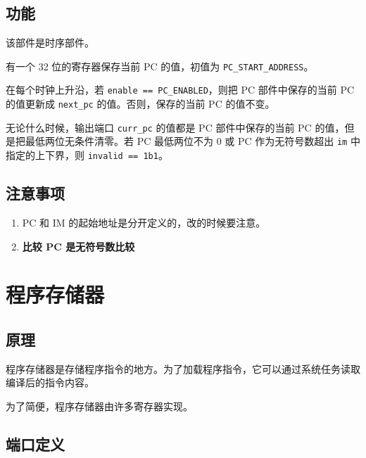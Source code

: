 \documentclass[12pt,AutoFakeBold,AutoFakeSlant]{article}
\providecommand{\tightlist}{%
  \setlength{\itemsep}{0pt}\setlength{\parskip}{0pt}}
\begin{document}
\hypertarget{ux529fux80fd-1}{%
\subsection{功能}\label{ux529fux80fd-1}}

该部件是时序部件。

有一个 32 位的寄存器保存当前 PC 的值，初值为
\texttt{PC\_START\_ADDRESS}。

在每个时钟上升沿，若 \texttt{enable\ ==\ PC\_ENABLED}，则把 PC
部件中保存的当前 PC 的值更新成 \texttt{next\_pc} 的值。否则，保存的当前
PC 的值不变。

无论什么时候，输出端口 \texttt{curr\_pc} 的值都是 PC 部件中保存的当前 PC
的值，但是把最低两位无条件清零。若 PC 最低两位不为 0 或 PC
作为无符号数超出 \texttt{im} 中指定的上下界，则
\texttt{invalid\ ==\ 1\textquotesingle{}b1}。

\hypertarget{ux6ce8ux610fux4e8bux9879-1}{%
\subsection{注意事项}\label{ux6ce8ux610fux4e8bux9879-1}}

\begin{enumerate}
\def\labelenumi{\arabic{enumi}.}
\tightlist
\item
  PC 和 IM 的起始地址是分开定义的，改的时候要注意。
\item
  \textbf{比较 PC 是无符号数比较}
\end{enumerate}

\hypertarget{ux7a0bux5e8fux5b58ux50a8ux5668}{%
\section{程序存储器}\label{ux7a0bux5e8fux5b58ux50a8ux5668}}

\hypertarget{ux539fux7406-2}{%
\subsection{原理}\label{ux539fux7406-2}}

程序存储器是存储程序指令的地方。为了加载程序指令，它可以通过系统任务读取编译后的指令内容。

为了简便，程序存储器由许多寄存器实现。

\hypertarget{ux7aefux53e3ux5b9aux4e49-1}{%
\subsection{端口定义}\label{ux7aefux53e3ux5b9aux4e49-1}}
\end{document}
